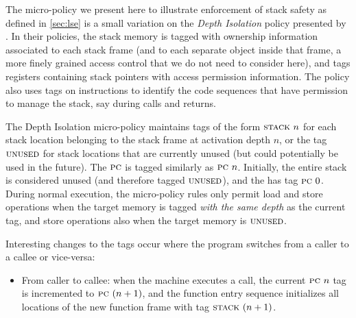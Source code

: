 \documentclass[acmsmall,review,anonymous]{acmart}\settopmatter{printfolios=true,printccs=false,printacmref=false}
\begin{document}
{%

The micro-policy we present here to illustrate enforcement of stack
safety as defined in \cref{sec:lse} is a small variation
on the {\em Depth Isolation} policy presented by
\citet{DBLP:conf/sp/RoesslerD18}. In their policies,  the stack memory is tagged
with ownership information associated to each stack frame (and to each
separate object inside that frame, a more finely grained access
control that we do not need to consider here), and tags registers containing
stack pointers with access permission information. The policy also
uses tags on instructions to identify the code
sequences that have permission to manage the stack, say during calls and returns.

The Depth Isolation micro-policy maintains tags of the form $\textsc{stack} ~ n$ for
each stack location belonging to the stack frame at activation depth
$n$, or the tag $\textsc{unused}$ for stack locations that are currently
unused (but could potentially be used in the future).
%
The $\textsc{pc}$ is tagged similarly as $\textsc{pc} ~ n$.
%
Initially, the entire stack is considered unused (and therefore tagged
$\textsc{unused}$), and the {\PCname} has tag $\textsc{pc} ~ 0$.
%
During normal execution, the micro-policy rules only permit load and
store operations when the target memory is tagged {\em with the same
  depth} as the current {\PCname} tag, and store operations also when the
target memory is $\textsc{unused}$.

Interesting changes to the tags occur where the program switches from
a caller to a callee or vice-versa:

\begin{itemize}

\item From caller to callee: when the machine executes a call,
  the current
  $\textsc{pc} ~ n$ tag is incremented to $\textsc{pc} ~ (n + 1)$, and the function
  entry sequence initializes  all locations of the new function frame with
  tag $\textsc{stack} ~ (n + 1)$.


\end{itemize}}
\end{document}
